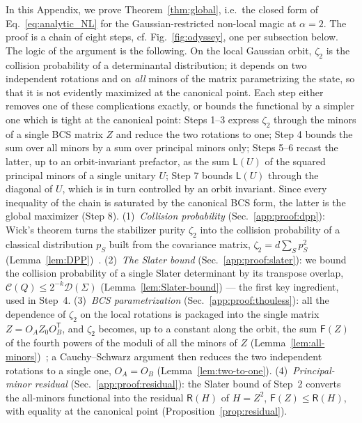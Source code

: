 \documentclass[prx,twocolumn,superscriptaddress,aps,10pt, frontmatterverbose, reprint,footinbib,longbibliography=true]{revtex4-2}
\newcommand{\trans}{\mathsf{T}}
\newcommand{\RENYI}{\alpha}
\begin{document}
In this Appendix, we prove Theorem~\ref{thm:global}, i.e.\ the closed form of Eq.~\eqref{eq:analytic_NL} for the Gaussian-restricted non-local magic at $\RENYI=2$. The proof is a chain of eight steps, cf. Fig.~\ref{fig:odyssey}, one per subsection below.
The logic of the argument is the following. On the local Gaussian orbit, $\zeta_2$ is the collision probability of a determinantal distribution; it depends on two independent rotations and on \emph{all} minors of the matrix parametrizing the state, so that it is not evidently maximized at the canonical point. Each step either removes one of these complications exactly, or bounds the functional by a simpler one which is tight at the canonical point: Steps 1--3 express $\zeta_2$ through the minors of a single BCS matrix $Z$ and reduce the two rotations to one; Step 4 bounds the sum over all minors by a sum over principal minors only; Steps 5--6 recast the latter, up to an orbit-invariant prefactor, as the sum $\mathsf{L}(U)$ of the squared principal minors of a single unitary $U$; Step 7 bounds $\mathsf{L}(U)$ through the diagonal of $U$, which is in turn controlled by an orbit invariant. Since every inequality of the chain is saturated by the canonical BCS form, the latter is the global maximizer (Step 8).
(1)~\emph{Collision probability} (Sec.~\ref{app:proof:dpp}):  Wick's theorem turns the stabilizer purity $\zeta_2$ into the collision probability of a classical distribution $p_S$  built from the covariance matrix, $\zeta_2=d\sum_Sp_S^2$ (Lemma~\ref{lem:DPP})~\cite{collura2026nonstabilizernessfermionicgaussianstates}.
(2)~\emph{The Slater bound}  (Sec.~\ref{app:proof:slater}): we bound the collision probability of a single Slater determinant by its transpose overlap, $\mathcal{C}(Q)\le2^{-k}\mathcal{D}(\Sigma)$ (Lemma~\ref{lem:Slater-bound}) --- the first key ingredient, used in Step~4.
(3)~\emph{BCS parametrization} (Sec.~\ref{app:proof:thouless}): all the dependence of $\zeta_2$ on the local rotations is packaged into the single matrix $Z=O_AZ_0O_B^{\trans}$, and $\zeta_2$ becomes, up to a constant along the orbit, the sum $\mathsf{F}(Z)$ of the fourth powers of the moduli of all the minors of $Z$ (Lemma~\ref{lem:all-minors})~\cite{Mbeng2024,surace}; a Cauchy--Schwarz argument then reduces the two independent rotations to a single one, $O_A=O_B$  (Lemma~\ref{lem:two-to-one}).
(4)~\emph{Principal-minor residual} (Sec.~\ref{app:proof:residual}): the Slater bound of Step~2  converts the all-minors functional into the residual  $\mathsf{R}(H)$ of $H=Z^2$, $\mathsf{F}(Z)\le\mathsf{R}(H)$, with equality at the canonical point (Proposition~\ref{prop:residual}).
\end{document}

